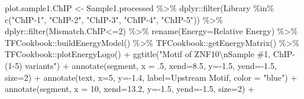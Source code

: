 \documentclass[
]{article}
\newenvironment{Shaded}{\begin{snugshade}}{\end{snugshade}}
\newcommand{\AttributeTok}[1]{\textcolor[rgb]{0.77,0.63,0.00}{#1}}
\newcommand{\DecValTok}[1]{\textcolor[rgb]{0.00,0.00,0.81}{#1}}
\newcommand{\FloatTok}[1]{\textcolor[rgb]{0.00,0.00,0.81}{#1}}
\newcommand{\FunctionTok}[1]{\textcolor[rgb]{0.00,0.00,0.00}{#1}}
\newcommand{\NormalTok}[1]{#1}
\newcommand{\OtherTok}[1]{\textcolor[rgb]{0.56,0.35,0.01}{#1}}
\newcommand{\SpecialCharTok}[1]{\textcolor[rgb]{0.00,0.00,0.00}{#1}}
\newcommand{\StringTok}[1]{\textcolor[rgb]{0.31,0.60,0.02}{#1}}
\begin{document}
\begin{Shaded}
\begin{Highlighting}[]
\NormalTok{plot.sample1.ChIP }\OtherTok{\textless{}{-}}\NormalTok{ Sample1.processed }\SpecialCharTok{\%\textgreater{}\%}
\NormalTok{  dplyr}\SpecialCharTok{::}\FunctionTok{filter}\NormalTok{(Library }\SpecialCharTok{\%in\%} \FunctionTok{c}\NormalTok{(}\StringTok{"ChIP{-}1"}\NormalTok{, }\StringTok{"ChIP{-}2"}\NormalTok{, }\StringTok{"ChIP{-}3"}\NormalTok{, }\StringTok{"ChIP{-}4"}\NormalTok{, }\StringTok{"ChIP{-}5"}\NormalTok{)) }\SpecialCharTok{\%\textgreater{}\%}
\NormalTok{  dplyr}\SpecialCharTok{::}\FunctionTok{filter}\NormalTok{(Mismatch.ChIP}\SpecialCharTok{\textless{}=}\DecValTok{2}\NormalTok{) }\SpecialCharTok{\%\textgreater{}\%}
  \FunctionTok{rename}\NormalTok{(}\AttributeTok{Energy=}\StringTok{\textasciigrave{}}\AttributeTok{Relative Energy}\StringTok{\textasciigrave{}}\NormalTok{) }\SpecialCharTok{\%\textgreater{}\%}
\NormalTok{  TFCookbook}\SpecialCharTok{::}\FunctionTok{buildEnergyModel}\NormalTok{() }\SpecialCharTok{\%\textgreater{}\%}
\NormalTok{  TFCookbook}\SpecialCharTok{::}\FunctionTok{getEnergyMatrix}\NormalTok{() }\SpecialCharTok{\%\textgreater{}\%}
\NormalTok{  TFCookbook}\SpecialCharTok{::}\FunctionTok{plotEnergyLogo}\NormalTok{() }\SpecialCharTok{+}
  \FunctionTok{ggtitle}\NormalTok{(}\StringTok{"Motif of ZNF10}\SpecialCharTok{\textbackslash{}n}\StringTok{Sample \#1, ChIP{-}(1{-}5) variants"}\NormalTok{) }\SpecialCharTok{+}
  \FunctionTok{annotate}\NormalTok{(}\StringTok{\textquotesingle{}segment\textquotesingle{}}\NormalTok{, }\AttributeTok{x =}\NormalTok{ .}\DecValTok{5}\NormalTok{, }\AttributeTok{xend=}\FloatTok{8.5}\NormalTok{, }\AttributeTok{y=}\SpecialCharTok{{-}}\FloatTok{1.5}\NormalTok{, }\AttributeTok{yend=}\SpecialCharTok{{-}}\FloatTok{1.5}\NormalTok{, }\AttributeTok{size=}\DecValTok{2}\NormalTok{) }\SpecialCharTok{+} 
  \FunctionTok{annotate}\NormalTok{(}\StringTok{\textquotesingle{}text\textquotesingle{}}\NormalTok{, }\AttributeTok{x=}\DecValTok{5}\NormalTok{, }\AttributeTok{y=}\SpecialCharTok{{-}}\FloatTok{1.4}\NormalTok{, }\AttributeTok{label=}\StringTok{\textquotesingle{}Upstream Motif\textquotesingle{}}\NormalTok{, }\AttributeTok{color =} \StringTok{"blue"}\NormalTok{) }\SpecialCharTok{+} 
  \FunctionTok{annotate}\NormalTok{(}\StringTok{\textquotesingle{}segment\textquotesingle{}}\NormalTok{, }\AttributeTok{x =} \DecValTok{10}\NormalTok{, }\AttributeTok{xend=}\FloatTok{13.2}\NormalTok{, }\AttributeTok{y=}\SpecialCharTok{{-}}\FloatTok{1.5}\NormalTok{, }\AttributeTok{yend=}\SpecialCharTok{{-}}\FloatTok{1.5}\NormalTok{, }\AttributeTok{size=}\DecValTok{2}\NormalTok{) }\SpecialCharTok{+} 

\end{Highlighting}
\end{Shaded}
\end{document}
